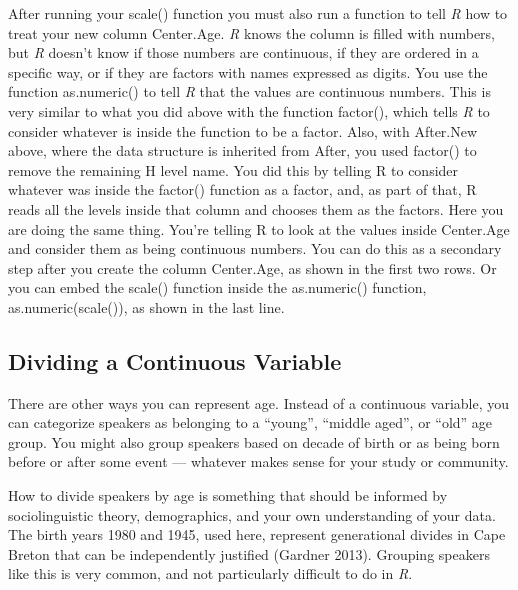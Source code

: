 \documentclass[
  12pt,
  letterpaper]{article}
\renewcommand\texttt[1]{{\ttfamily\color{BrickRed}#1}}
\begin{document}
After running your \texttt{scale()} function you must also run a
function to tell \emph{R} how to treat your new column
\texttt{Center.Age.} \emph{R} knows the column is filled with numbers,
but \emph{R} doesn't know if those numbers are continuous, if they are
ordered in a specific way, or if they are factors with names expressed
as digits. You use the function \texttt{as.numeric()} to tell \emph{R}
that the values are continuous numbers. This is very similar to what you
did above with the function \texttt{factor()}, which tells \emph{R} to
consider whatever is inside the function to be a factor. Also, with
\texttt{After.New} above, where the data structure is inherited from
\texttt{After}, you used \texttt{factor()} to remove the remaining
\texttt{H} level name. You did this by telling \texttt{R} to consider
whatever was inside the \texttt{factor()} function as a factor, and, as
part of that, \texttt{R} reads all the levels inside that column and
chooses them as the factors. Here you are doing the same thing. You're
telling \texttt{R} to look at the values inside \texttt{Center.Age} and
consider them as being continuous numbers. You can do this as a
secondary step after you create the column \texttt{Center.Age}, as shown
in the first two rows. Or you can embed the \texttt{scale()} function
inside the \texttt{as.numeric()} function, \texttt{as.numeric(scale())},
as shown in the last line.

\hypertarget{dividing-a-continuous-variable}{%
\subsection{Dividing a Continuous
Variable}\label{dividing-a-continuous-variable}}

There are other ways you can represent age. Instead of a continuous
variable, you can categorize speakers as belonging to a ``young'',
``middle aged'', or ``old'' age group. You might also group speakers
based on decade of birth or as being born before or after some event ---
whatever makes sense for your study or community.

How to divide speakers by age is something that should be informed by
sociolinguistic theory, demographics, and your own understanding of your
data. The birth years 1980 and 1945, used here, represent generational
divides in Cape Breton that can be independently justified (Gardner
2013). Grouping speakers like this is very common, and not particularly
difficult to do in \emph{R}.
\end{document}
